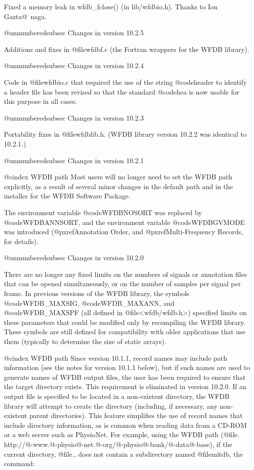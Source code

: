 Fixed a memory leak in wfdb_fclose() (in lib/wfdbio.h).  Thanks to
Ion Gazta@~naga.

@unnumberedsubsec Changes in version 10.2.5

Additions and fixes in @file{wfdbf.c} (the Fortran wrappers for the WFDB
library).

@unnumberedsubsec Changes in version 10.2.4

Code in @file{wfdbio.c} that required the use of the string
@code{header} to identify a header file has been revised so that the
standard @code{hea} is now usable for this purpose in all cases.

@unnumberedsubsec Changes in version 10.2.3

Portability fixes in @file{wfdblib.h}.  (WFDB library version 10.2.2 was
identical to 10.2.1.)

@unnumberedsubsec Changes in version 10.2.1

@cindex WFDB path
Most users will no longer need to set the WFDB path explicitly, as a result
of several minor changes in the default path and in the installer for the
WFDB Software Package.

The environment variable @code{WFDBNOSORT} was replaced by @code{WFDBANNSORT},
and the environment variable @code{WFDBGVMODE} was introduced
(@pxref{Annotation Order}, and @pxref{Multi-Frequency Records}, for details).

@unnumberedsubsec Changes in version 10.2.0

There are no longer any fixed limits on the numbers of signals or annotation
files that can be opened simultaneously, or on the number of samples per signal
per frame.  In previous versions of the WFDB library, the symbols
@code{WFDB_MAXSIG}, @code{WFDB_MAXANN}, and @code{WFDB_MAXSPF} (all defined in
@file{<wfdb/wfdb.h>}) specified limits on these parameters that could be
modified only by recompiling the WFDB library.  These symbols are still defined
for compatibility with older applications that use them (typically to determine
the size of static arrays).

@cindex WFDB path
Since version 10.1.1, record names may include path information (see the notes
for version 10.1.1 below), but if such names are used to generate names of WFDB
output files, the user has been required to ensure that the target directory
exists.  This requirement is eliminated in version 10.2.0.  If an output file
is specified to be located in a non-existent directory, the WFDB library will
attempt to create the directory (including, if necessary, any non-existent
parent directories).  This feature simplifies the use of record names that
include directory information, as is common when reading data from a CD-ROM or
a web server such as PhysioNet.  For example, using the WFDB path
(@file{. http://@-www.@-physio@-net.@-org/@-physio@-bank/@-data@-base}), if the
current directory, @file{.}, does not contain a subdirectory named
@file{mitdb}, the command:

